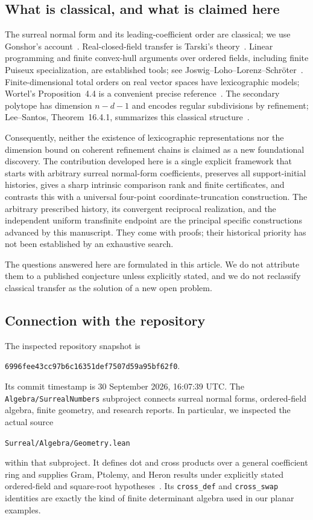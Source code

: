 \documentclass[11pt,a4paper]{article}
\numberwithin{equation}{section}
\theoremstyle{plain}
\newcommand{\snapshot}{6996fee43cc97b6c16351def7507d59a95bf62f0}
\begin{document}
\subsection{What is classical, and what is claimed here}\label{poly:ts:sec:priority}
The surreal normal form and its leading-coefficient order are classical;
we use Gonshor's account~\cite{fs:Gonshor}. Real-closed-field transfer is
Tarski's theory~\cite{ts:vdD}. Linear programming and finite convex-hull
arguments over ordered fields, including finite Puiseux specialization, are
established tools; see Joswig--Loho--Lorenz--Schr\"oter~\cite{ts:JLLS}.
Finite-dimensional total orders on real vector spaces have lexicographic
models; Wortel's Proposition~4.4 is a convenient precise
reference~\cite{ts:Wortel}. The secondary polytope has dimension $n-d-1$ and
encodes regular subdivisions by refinement; Lee--Santos,
Theorem~16.4.1, summarizes this classical structure~\cite{ts:LS}.

Consequently, neither the existence of lexicographic representations nor
the dimension bound on coherent refinement chains is claimed as a new
foundational discovery. The contribution developed here is a single explicit
framework that starts with arbitrary surreal normal-form coefficients,
preserves all support-initial histories, gives a sharp intrinsic comparison
rank and finite certificates, and contrasts this with a universal
four-point coordinate-truncation construction. The arbitrary prescribed
history, its convergent reciprocal realization, and the independent uniform
transfinite endpoint are the principal specific constructions advanced by
this manuscript. They come with proofs; their historical priority has not
been established by an exhaustive search.

The questions answered here are formulated in this article. We do not
attribute them to a published conjecture unless explicitly stated, and we
do not reclassify classical transfer as the solution of a new open problem.

\subsection{Connection with the repository}
The inspected repository snapshot is
\begin{center}\small\texttt{\snapshot}.\end{center}
Its commit timestamp is 30 September 2026, 16:07:39 UTC.
The \texttt{Algebra/SurrealNumbers} subproject connects surreal normal forms,
ordered-field algebra, finite geometry, and research reports. In particular,
we inspected the actual source
\begin{center}\small
\texttt{Surreal/Algebra/Geometry.lean}
\end{center}
within that subproject. It defines dot and cross products over a general
coefficient ring and supplies Gram, Ptolemy, and Heron results under explicitly
stated ordered-field and square-root hypotheses~\cite{ts:ProveIt}. Its
\texttt{cross\_def} and \texttt{cross\_swap} identities are exactly the
kind of finite determinant algebra used in our planar examples.
\end{document}

